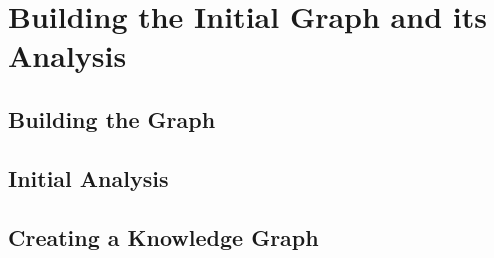 \chapter{Building the Initial Graph and its Analysis}\label{ch:graph-analisys}

\section{Building the Graph}\label{sec:graph-building}


\section{Initial Analysis}\label{sec:initial-analysis}



\section{Creating a Knowledge Graph}\label{sec:building-complete-knowledge-graph}
